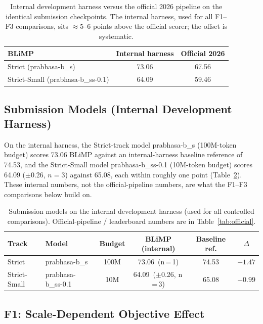 \begin{table}[t]
\centering
\caption{Internal development harness versus the official 2026 pipeline on the identical submission checkpoints. The internal harness, used for all F1--F3 comparisons, sits $\approx$5--6 points above the official scorer; the offset is systematic.}
\label{tab:harness}
{\small
\begin{tabular}{lcc}
\toprule
BLiMP & Internal harness & Official 2026 \\
\midrule
Strict (prabhasa-b\_s) & 73.06 & 67.56 \\
Strict-Small (prabhasa-b\_ss-0.1) & 64.09 & 59.46 \\
\bottomrule
\end{tabular}
}
\end{table}

\subsection{Submission Models (Internal Development Harness)}

On the internal harness, the Strict-track model prabhasa-b\_s (100M-token budget) scores 73.06 BLiMP against an internal-harness baseline reference of 74.53, and the Strict-Small model prabhasa-b\_ss-0.1 (10M-token budget) scores 64.09 ($\pm$0.26, $n=3$) against 65.08, each within roughly one point (Table~\ref{tab:headline}). These internal numbers, not the official-pipeline numbers, are what the F1--F3 comparisons below build on.

\begin{table}[t]
\centering
\caption{Submission models on the internal development harness (used for all controlled comparisons). Official-pipeline / leaderboard numbers are in Table~\ref{tab:official}.}
\label{tab:headline}
{\small
\begin{tabular}{llcccc}
\toprule
Track & Model & Budget & BLiMP (internal) & Baseline ref. & $\Delta$ \\
\midrule
Strict & prabhasa-b\_s & 100M & 73.06 \,(n\,=\,1) & 74.53 & $-1.47$ \\
Strict-Small & prabhasa-b\_ss-0.1 & 10M & 64.09 \,($\pm$0.26, n\,=\,3) & 65.08 & $-0.99$ \\
\bottomrule
\end{tabular}
}
\end{table}

\subsection{F1: Scale-Dependent Objective Effect}


